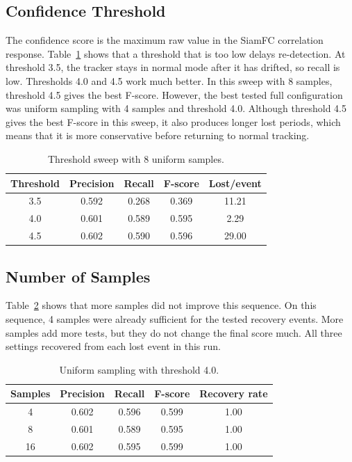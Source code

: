 \documentclass[9pt]{IEEEtran}
\begin{document}
\subsection{Confidence Threshold}

The confidence score is the maximum raw value in the SiamFC correlation response. Table~\ref{tab:threshold} shows that a threshold that is too low delays re-detection. At threshold 3.5, the tracker stays in normal mode after it has drifted, so recall is low. Thresholds 4.0 and 4.5 work much better. In this sweep with 8 samples, threshold 4.5 gives the best F-score. However, the best tested full configuration was uniform sampling with 4 samples and threshold 4.0. Although threshold 4.5 gives the best F-score in this sweep, it also produces longer lost periods, which means that it is more conservative before returning to normal tracking.

\begin{table}[h]
    \centering
    \caption{Threshold sweep with 8 uniform samples.}
    \label{tab:threshold}
    \scriptsize
    \begin{tabular}{ccccc}
        \hline
        Threshold & Precision & Recall & F-score & Lost/event \\
        \hline
        3.5       & 0.592     & 0.268  & 0.369   & 11.21      \\
        4.0       & 0.601     & 0.589  & 0.595   & 2.29       \\
        4.5       & 0.602     & 0.590  & 0.596   & 29.00      \\
        \hline
    \end{tabular}
\end{table}

\subsection{Number of Samples}

Table~\ref{tab:samples} shows that more samples did not improve this sequence. On this sequence, 4 samples were already sufficient for the tested recovery events. More samples add more tests, but they do not change the final score much. All three settings recovered from each lost event in this run.

\begin{table}[h]
    \centering
    \caption{Uniform sampling with threshold 4.0.}
    \label{tab:samples}
    \scriptsize
    \begin{tabular}{ccccc}
        \hline
        Samples & Precision & Recall & F-score & Recovery rate \\
        \hline
        4       & 0.602     & 0.596  & 0.599   & 1.00          \\
        8       & 0.601     & 0.589  & 0.595   & 1.00          \\
        16      & 0.602     & 0.595  & 0.599   & 1.00          \\
        \hline
    \end{tabular}
\end{table}
\end{document}
